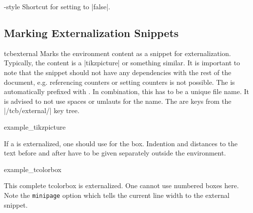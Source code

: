 \begin{extTcbKey}[][doc new=2015-06-12]{-}{}{style}
  Shortcut for setting  to |false|.
\end{extTcbKey}


\subsection{Marking Externalization Snippets}\label{subsec:external_marking}

\begin{docEnvironment}[doc new=2015-03-11]{tcbexternal}{}
Marks the environment content as a snippet for externalization.
Typically, the content is a |tikzpicture| or something similar.
It is important to note that the snippet should not have any dependencies
with the rest of the document, e.g. referencing counters or setting counters
is not possible.
The  is automatically prefixed with .
In combination, this has to be a unique file name. It is advised to not
use spaces or umlauts for the name.
The  are keys from the |/tcb/external/| key tree.

\begin{dispExample}
\begin{tcbexternal}{example_tikzpicture}
\end{tcbexternal}
\end{dispExample}

\medskip

If a  is externalized, one should use
 for the box. Indention and distances to
the text before and after have to be given separately outside the
 environment.

\begin{dispExample}
\noindent%
\begin{tcbexternal}[minipage]{example_tcolorbox}
  \begin{tcolorbox}[nobeforeafter,enhanced,
      fonttitle=\bfseries,title=Externalized Box,
      colframe=red!50!black,drop fuzzy shadow,
      interior style={fill overzoom image=goldshade.png}]
    This complete tcolorbox is externalized. One cannot use numbered
    boxes here. Note the \texttt{minipage} option which tells the
    current line width to the external snippet.
  \end{tcolorbox}
\end{tcbexternal}
\end{dispExample}


\end{docEnvironment}
